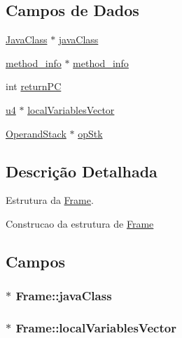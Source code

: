 \subsection*{Campos de Dados}
\begin{DoxyCompactItemize}
\item 
\hyperlink{struct_java_class}{Java\+Class} $\ast$ \hyperlink{struct_frame_ac06cb2c272949f9290bca323136f6438}{java\+Class}
\item 
\hyperlink{_e___j_v_m_8h_a02c1a928a94e9fab2c72044003c7bce6}{method\+\_\+info} $\ast$ \hyperlink{struct_frame_a4dbf8107ea01f748582bb060aa299628}{method\+\_\+info}
\item 
int \hyperlink{struct_frame_a0f431de4c352b8c9a170a8e74d7c3a15}{return\+P\+C}
\item 
\hyperlink{_e___j_v_m_8h_aedf6ddc03df8caaaccbb4c60b9a9b850}{u4} $\ast$ \hyperlink{struct_frame_a17cc84db651051b7d067f14eebe7c8b6}{local\+Variables\+Vector}
\item 
\hyperlink{struct_operand_stack}{Operand\+Stack} $\ast$ \hyperlink{struct_frame_a0cd2446df36707c236ffaf43844d387a}{op\+Stk}
\end{DoxyCompactItemize}


\subsection{Descrição Detalhada}
Estrutura da \hyperlink{struct_frame}{Frame}. 

Construcao da estrutura de \hyperlink{struct_frame}{Frame} 

\subsection{Campos}
\hypertarget{struct_frame_ac06cb2c272949f9290bca323136f6438}{}
\subsubsection[{java\+Class}]{$\ast$ Frame\+::java\+Class}\label{struct_frame_ac06cb2c272949f9290bca323136f6438}
\hypertarget{struct_frame_a17cc84db651051b7d067f14eebe7c8b6}{}
\subsubsection[{local\+Variables\+Vector}]{$\ast$ Frame\+::local\+Variables\+Vector}\label{struct_frame_a17cc84db651051b7d067f14eebe7c8b6}
\hypertarget{struct_frame_a4dbf8107ea01f748582bb060aa299628}{}
